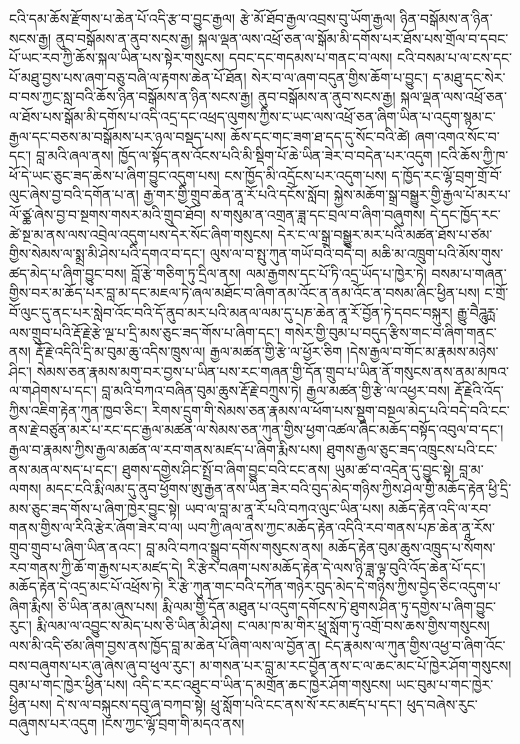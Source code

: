 \documentclass{article}
\begin{document}
ངའི་དམ་ཆོས་རྫོགས་པ་ཆེན་པོ་འདི་རྩ་བ་བྱུང་རྒྱལ། རྩེ་མོ་ཐོབ་རྒྱལ་འབྲས་བུ་ཡོག་རྒྱལ། ཉིན་བསྒོམས་ན་ཉིན་སངས་རྒྱ། ནུབ་བསྒོམས་ན་ནུབ་སངས་རྒྱ། སྐལ་ལྡན་ལས་འཕྲོ་ཅན་ལ་སྒོམ་མི་དགོས་པར་ཐོས་པས་གྲོལ་བ་དབང་པོ་ཡང་རབ་ཀྱི་ཆོས་སྐལ་ཡིན་པས་སྟེར་གསུངས། དབང་དང་གདམས་པ་གནང་བ་ལས། ངའི་བསམ་པ་ལ་ངས་དང་པོ་མཐུ་བྱས་པས་ཞག་བཅུ་བཞི་ལ་རྟགས་ཆེན་པོ་ཐོན། སེར་བ་ལ་ཞག་བདུན་གྱིས་ཆོག་པ་བྱུང་། ད་མཐུ་དང་སེར་བ་བས་ཀྱང་སླ་བའི་ཆོས་ཉིན་བསྒོམས་ན་ཉིན་སངས་རྒྱ། ནུབ་བསྒོམས་ན་ནུབ་སངས་རྒྱ། སྐལ་ལྡན་ལས་འཕྲོ་ཅན་ལ་ཐོས་པས་སྒོམ་མི་དགོས་པ་འདི་འདྲ་དང་འཕྲད་ལུགས་ཀྱིས་ང་ཡང་ལས་འཕྲོ་ཅན་ཞིག་ཡིན་པ་འདུག་སྙམ་ང་རྒྱལ་དང་བཅས་མ་བསྒོམས་པར་ཉལ་བསྡད་པས། ཆོས་དང་གང་ཟག་ཐ་དད་དུ་སོང་བའི་ཚེ། ཞག་འགའ་སོང་བ་དང་། བླ་མའི་ཞལ་ནས། ཁྱོད་ལ་སྟོད་ནས་འོངས་པའི་མི་སྡིག་པོ་ཆེ་ཡིན་ཟེར་བ་བདེན་པར་འདུག །ངའི་ཆོས་ཀྱི་ཁ་ཕོ་དེ་ཡང་ཅུང་ཟད་ཆེས་པ་ཞིག་བྱུང་འདུག་པས། ངས་ཁྱོད་མི་འདྲོངས་པར་འདུག་པས། ད་ཁྱོད་རང་ལྷོ་བྲག་གྲོ་བོ་ལུང་ཞེས་བྱ་བའི་དགོན་པ་ན། རྒྱ་གར་གྱི་གྲུབ་ཆེན་ནཱ་རོ་པའི་དངོས་སློབ། སྐྱེས་མཆོག་སྒྲ་བསྒྱུར་གྱི་རྒྱལ་པོ་མར་པ་ལོ་ཙྪ་ཞེས་བྱ་བ་སྔགས་གསར་མའི་གྲུབ་ཐོབ། ས་གསུམ་ན་འགྲན་ཟླ་དང་བྲལ་བ་ཞིག་བཞུགས། དེ་དང་ཁྱོད་རང་ཚེ་སྔ་མ་ནས་ལས་འབྲེལ་འདུག་པས་དེར་སོང་ཞིག་གསུངས། དེར་ང་ལ་སྒྲ་བསྒྱུར་མར་པའི་མཚན་ཐོས་པ་ཙམ་གྱིས་སེམས་ལ་སྨྲ་མི་ཤེས་པའི་དགའ་བ་དང་། ལུས་ལ་བ་སྤུ་ཀུན་གཡོ་བའི་བདེ་བ། མཆི་མ་འཁྲུག་པའི་མོས་གུས་ཚད་མེད་པ་ཞིག་བྱུང་བས། བློ་རྩེ་གཅིག་ཏུ་དྲིལ་ནས། ལམ་རྒྱགས་དང་པོ་ཏི་འདྲ་ཡོད་པ་ཁྱེར་ཏེ། བསམ་པ་གཞན་གྱིས་བར་མ་ཆོད་པར་བླ་མ་དང་མཇལ་ཏེ་ཞལ་མཐོང་བ་ཞིག་ནམ་འོང་ན་ནམ་འོང་ན་བསམ་ཞིང་ཕྱིན་པས། ང་གྲོ་བོ་ལུང་དུ་ནང་པར་སླེབ་འོང་བའི་དོ་ནུབ་མར་པའི་མནལ་ལམ་དུ་པཎ་ཆེན་ནཱ་རོ་བྱོན་ཏེ་དབང་བསྐུར། རྒྱུ་བཻཌཱུརྻ་ལས་གྲུབ་པའི་རྡོ་རྗེ་རྩེ་ལྔ་པ་དྲི་མས་ཅུང་ཟད་གོས་པ་ཞིག་དང་། གསེར་གྱི་བུམ་པ་བདུད་རྩིས་གང་བ་ཞིག་གནང་ནས། རྡོ་རྗེ་འདིའི་དྲི་མ་བུམ་ཆུ་འདིས་ཁྲུས་ལ། རྒྱལ་མཚན་གྱི་རྩེ་ལ་ཕྱོར་ཅིག །དེས་རྒྱལ་བ་གོང་མ་རྣམས་མཉེས་ཤིང་། སེམས་ཅན་རྣམས་མགུ་བར་བྱས་པ་ཡིན་པས་རང་གཞན་གྱི་དོན་གྲུབ་པ་ཡིན་ནོ་གསུངས་ནས་ནམ་མཁའ་ལ་གཤེགས་པ་དང་། བླ་མའི་བཀའ་བཞིན་བུམ་ཆུས་རྡོ་རྗེ་བཀྲུས་ཏེ། རྒྱལ་མཚན་གྱི་རྩེ་ལ་འཕྱར་བས། རྡོ་རྗེའི་འོད་ཀྱིས་འཇིག་རྟེན་ཀུན་ཁྱབ་ཅིང་། རིགས་དྲུག་གི་སེམས་ཅན་རྣམས་ལ་ཕོག་པས་སྡུག་བསྔལ་མེད་པའི་བདེ་བའི་ངང་ནས་རྗེ་བཙུན་མར་པ་རང་དང་རྒྱལ་མཚན་ལ་སེམས་ཅན་ཀུན་གྱིས་ཕྱག་འཚལ་ཞིང་མཆོད་བསྟོད་འབུལ་བ་དང་། རྒྱལ་བ་རྣམས་ཀྱིས་རྒྱལ་མཚན་ལ་རབ་གནས་མཛད་པ་ཞིག་རྨིས་པས། ཐུགས་རྒྱལ་ཅུང་ཟད་འཁྲུངས་པའི་ངང་ནས་མནལ་སད་པ་དང་། ཐུགས་དགྱེས་ཤིང་སྤྲོ་བ་ཞིག་བྱུང་བའི་ངང་ནས། ཡུམ་ཚ་བ་འདྲེན་དུ་བྱུང་སྟེ། བླ་མ་ལགས། མདང་ངའི་རྨི་ལམ་དུ་ནུབ་ཕྱོགས་ཨུ་རྒྱན་ནས་ཡིན་ཟེར་བའི་བུད་མེད་གཉིས་ཀྱིས་ཤེལ་གྱི་མཆོད་རྟེན་ཕྱི་དྲི་མས་ཅུང་ཟད་གོས་པ་ཞིག་ཁྱེར་བྱུང་སྟེ། ཡབ་ལ་བླ་མ་ནཱ་རོ་པའི་བཀའ་ལུང་ཡིན་པས། མཆོད་རྟེན་འདི་ལ་རབ་གནས་གྱིས་ལ་རིའི་རྩེར་ཞོག་ཟེར་བ་ལ། ཡབ་ཀྱི་ཞལ་ནས་ཀྱང་མཆོད་རྟེན་འདིའི་རབ་གནས་པཎ་ཆེན་ནཱ་རོས་གྲུབ་གྲུབ་པ་ཞིག་ཡིན་ནའང་། བླ་མའི་བཀའ་སྒྲུབ་དགོས་གསུངས་ནས། མཆོད་རྟེན་བུམ་ཆུས་འཁྲུད་པ་སོགས་རབ་གནས་ཀྱི་ཆོ་ག་རྒྱས་པར་མཛད་དེ། རི་རྩེར་བཞག་པས་མཆོད་རྟེན་དེ་ལས་ཉི་ཟླ་ལྟ་བུའི་འོད་ཆེན་པོ་དང་། མཆོད་རྟེན་དེ་འདྲ་མང་པོ་འཕྲོས་ཏེ། རི་རྩེ་ཀུན་གང་བའི་དཀོན་གཉེར་བུད་མེད་དེ་གཉིས་ཀྱིས་བྱེད་ཅིང་འདུག་པ་ཞིག་རྨིས། ཅི་ཡིན་ནམ་ཞུས་པས། རྨི་ལམ་གྱི་དོན་མཐུན་པ་འདུག་དགོངས་ཏེ་ཐུགས་ཤིན་ཏུ་དགྱེས་པ་ཞིག་བྱུང་རུང་། རྨི་ལམ་ལ་འབྱུང་ས་མེད་པས་ཅི་ཡིན་མི་ཤེས། ང་ལམ་ཁ་མ་གིར་ཕྲུ་སློག་ཏུ་འགྲོ་བས་ཆས་གྱིས་གསུངས། ལས་མི་འདི་ཙམ་ཞིག་བྱས་ནས་ཁྱོད་བླ་མ་ཆེན་པོ་ཞིག་ལས་ལ་བྱོན་ན། ངེད་རྣམས་ལ་ཀུན་གྱིས་འཕྱ་བ་ཞིག་འོང་བས་བཞུགས་པར་ཞུ་ཞེས་ཞུ་བ་ཕུལ་རུང་། མ་གསན་པར་བླ་མ་རང་བྱོན་ནས་ང་ལ་ཆང་མང་པོ་ཁྱེར་ཤོག་གསུངས། བུམ་པ་གང་ཁྱེར་ཕྱིན་པས། འདི་ང་རང་འཐུང་བ་ཡིན་ད་མགྲོན་ཆང་ཁྱེར་ཤོག་གསུངས། ཡང་བུམ་པ་གང་ཁྱེར་ཕྱིན་པས། དེ་ས་ལ་བསྐུངས་དབུ་ཞྭ་བཀབ་སྟེ། ཕྲུ་སློག་པའི་ངང་ནས་སོ་རང་མཛད་པ་དང་། ཕུད་བཞེས་རུང་བཞུགས་པར་འདུག །ངས་ཀྱང་ལྷོ་བྲག་གི་མདའ་ནས། 
\end{document}
